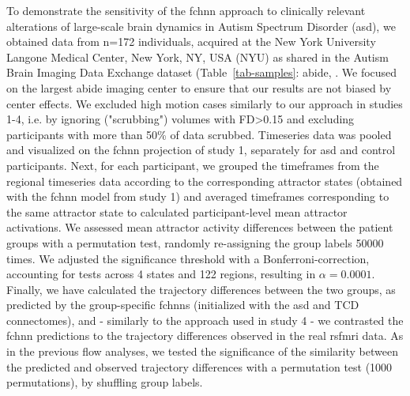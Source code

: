 \documentclass{article}
\begin{document}
To demonstrate the sensitivity of the \acrshort{fchnn} approach to clinically relevant alterations of large-scale brain dynamics in Autism Spectrum Disorder (\acrshort{asd}), we obtained data from n=172 individuals, acquired at the New York University Langone Medical Center, New York, NY, USA (NYU) as shared in the Autism Brain Imaging Data Exchange dataset (Table~\ref{tab-samples}: \acrshort{abide}, \citep{di2014autism}. We focused on the largest \acrshort{abide} imaging center to ensure that our results are not biased by center effects. We excluded high motion cases similarly to our approach in studies 1-4, i.e. by ignoring ("scrubbing") volumes with FD\textgreater 0.15 and excluding participants with more than 50\% of data scrubbed. Timeseries data was pooled and visualized on the \acrshort{fchnn} projection of study 1, separately for \acrshort{asd} and control participants.
Next, for each participant, we grouped the timeframes from the regional timeseries data according to the corresponding attractor states (obtained with the \acrshort{fchnn} model from study 1) and averaged timeframes corresponding to the same attractor state to calculated participant-level mean attractor activations.
We assessed mean attractor activity differences between the patient groups with a permutation test, randomly re-assigning the group labels 50000 times.
We adjusted the significance threshold with a Bonferroni-correction, accounting for tests across 4 states and 122 regions, resulting in $\alpha = 0.0001$.
Finally, we have calculated the trajectory differences between the two groups, as predicted by the group-specific \acrshort{fchnn}s (initialized with the \acrshort{asd} and TCD connectomes), and - similarly to the approach used in study 4 - we contrasted the \acrshort{fchnn} predictions to the trajectory differences observed in the real rs\acrshort{fmri} data. As in the previous flow analyses, we tested the significance of the similarity between the predicted and observed trajectory differences with a permutation test (1000 permutations), by shuffling group labels.
\printglossaries





\end{document}
